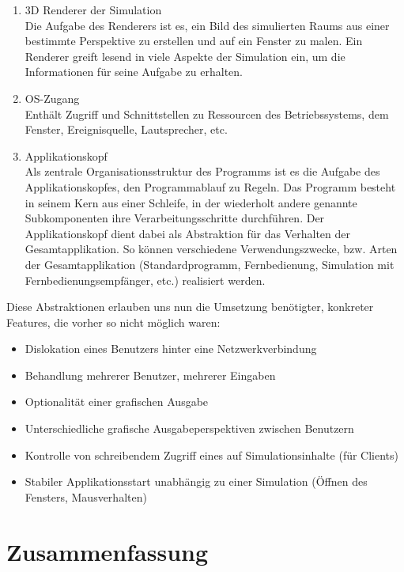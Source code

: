\documentclass[11pt,twoside,a4paper]{article}
\begin{document}
\begin{enumerate}
\item 3D Renderer der Simulation\\
Die Aufgabe des Renderers ist es, ein Bild des simulierten Raums aus einer bestimmte Perspektive zu erstellen und auf ein Fenster zu malen.
Ein Renderer greift lesend in viele Aspekte der Simulation ein, um die Informationen für seine Aufgabe zu erhalten.
\item OS-Zugang\\
Enthält Zugriff und Schnittstellen zu Ressourcen des Betriebssystems, dem Fenster, Ereignisquelle, Lautsprecher, etc.
\item Applikationskopf\\
Als zentrale Organisationsstruktur des Programms ist es die Aufgabe des Applikationskopfes, den Programmablauf zu Regeln. Das Programm besteht in seinem Kern aus einer Schleife, in der wiederholt andere genannte Subkomponenten ihre Verarbeitungsschritte durchführen. Der Applikationskopf dient dabei als Abstraktion für das Verhalten der Gesamtapplikation. So können verschiedene Verwendungszwecke, bzw. Arten der Gesamtapplikation (Standardprogramm, Fernbedienung, Simulation mit Fernbedienungsempfänger, etc.) realisiert werden.
\end{enumerate}

Diese Abstraktionen erlauben uns nun die Umsetzung benötigter, konkreter Features, die vorher so nicht möglich waren:
\begin{itemize}
\item Dislokation eines Benutzers hinter eine Netzwerkverbindung
\item Behandlung mehrerer Benutzer, mehrerer Eingaben
\item Optionalität einer grafischen Ausgabe
\item Unterschiedliche grafische Ausgabeperspektiven zwischen Benutzern
\item Kontrolle von schreibendem Zugriff eines auf Simulationsinhalte (für Clients)
\item Stabiler Applikationsstart unabhängig zu einer Simulation (Öffnen des Fensters, Mausverhalten)
\end{itemize}





\section{Zusammenfassung}

\end{document}
